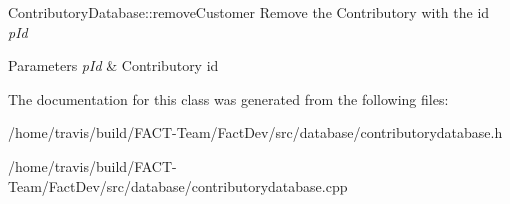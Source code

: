 Contributory\-Database\-::remove\-Customer Remove the Contributory with the id {\itshape p\-Id} 


\begin{DoxyParams}{Parameters}
{\em p\-Id} & Contributory id \\
\hline
\end{DoxyParams}


The documentation for this class was generated from the following files\-:\begin{DoxyCompactItemize}
\item 
/home/travis/build/\-F\-A\-C\-T-\/\-Team/\-Fact\-Dev/src/database/contributorydatabase.\-h\item 
/home/travis/build/\-F\-A\-C\-T-\/\-Team/\-Fact\-Dev/src/database/contributorydatabase.\-cpp\end{DoxyCompactItemize}
